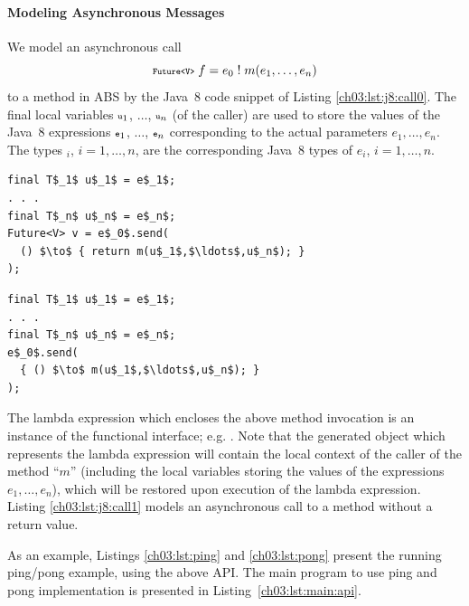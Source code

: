 \paragraph{Modeling Asynchronous Messages} 
\label{ch03:par:asynchronous_messages}
We model an asynchronous call 
$$
{\scriptsize\texttt{Future<V>}} \; f = e_0\; !\; m(e_1,\ldots,e_n)
$$
to a method in ABS by the Java~8 code snippet of Listing \ref{ch03:lst:j8:call0}.
The final local variables ${\scriptsize\texttt{u}}_1$, $\ldots$, ${\scriptsize\texttt{u}}_n$ (of the caller) are used to store the values of
the Java~8 expressions ${\scriptsize\texttt{e}}_1$, $\ldots$, ${\scriptsize\texttt{e}}_n$ corresponding to the actual parameters  $e_1,\ldots,e_n$.
The types $_i$, $i=1,\ldots,n$,  are the corresponding Java~8 types of  $e_i$, $i=1,\ldots,n$.
\begin{center}
\begin{minipage}[t]{0.48\textwidth}
\begin{lstlisting}[mathescape,caption=Async messages with futures,label=lst:j8:call0]
final T$_1$ u$_1$ = e$_1$;
. . . 
final T$_n$ u$_n$ = e$_n$;
Future<V> v = e$_0$.send(
  () $\to$ { return m(u$_1$,$\ldots$,u$_n$); }
);
\end{lstlisting}
\end{minipage}
\hfill
\begin{minipage}[t]{0.48\textwidth}
\begin{lstlisting}[mathescape,caption=Async messages w/o futures,label=lst:j8:call1]
final T$_1$ u$_1$ = e$_1$;
. . . 
final T$_n$ u$_n$ = e$_n$;
e$_0$.send(
  { () $\to$ m(u$_1$,$\ldots$,u$_n$); }
);
\end{lstlisting}
\end{minipage}
\end{center}

The lambda expression  which encloses the above method invocation  is an instance of the  functional interface; e.g. .
Note that the generated object which  represents the  lambda expression will contain the local context of the caller of the method ``$m$'' (including the local variables storing the values of the expressions $e_1,\ldots,e_n$), which will be restored upon execution of the lambda expression. 
Listing \ref{ch03:lst:j8:call1} models an asynchronous call to a method without a return value.

As an example, Listings \ref{ch03:lst:ping} and \ref{ch03:lst:pong} present the running ping/pong example, using the above API.
The main program to use ping and pong implementation is presented in Listing~\ref{ch03:lst:main:api}.

